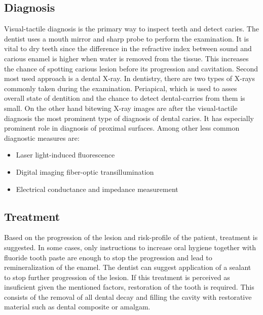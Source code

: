 \subsection{Diagnosis}
Visual-tactile diagnosis is the primary way to inspect teeth and detect caries. The dentist uses a mouth mirror and sharp probe to perform the examination. It is vital to dry teeth since the difference in the refractive index between sound and carious enamel is higher when water is removed from the tissue. This increases the chance of spotting carious lesion before its progression and cavitation. 
Second most used approach is a dental X-ray. In dentistry, there are two types of X-rays commonly taken during the examination. Periapical, which is used to asses overall state of dentition and the chance to detect dental-carries from them is small. On the other hand bitewing X-ray images are after the visual-tactile diagnosis the most prominent type of diagnosis of dental caries. It has especially prominent role in diagnosis of proximal surfaces. \newline
Among other less common diagnostic measures are:
\begin{itemize}
    \item Laser light-induced fluorescence
    \item Digital imaging fiber-optic transillumination
    \item Electrical conductance and impedance measurement
\end{itemize}

\subsection{Treatment}
Based on the progression of the lesion and risk-profile of the patient, treatment is suggested. In some cases, only instructions to increase oral hygiene together with fluoride tooth paste are enough to stop the progression and lead to remineralization of the enamel. The dentist can suggest application of a sealant to stop further progression of the lesion. If this treatment is perceived as insuficient given the mentioned factors, restoration of the tooth is required. This consists of the removal of all dental decay and filling the cavity with restorative material such as dental composite or amalgam.

